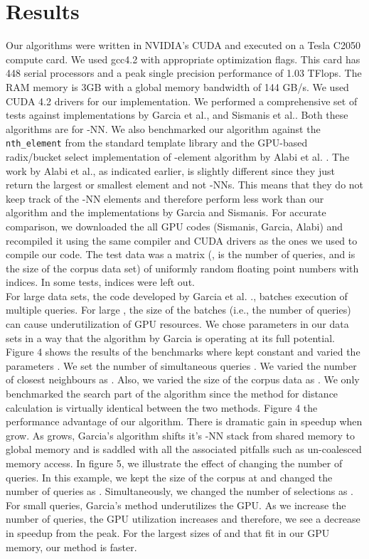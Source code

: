 \documentclass[10pt]{article}
\begin{document}
\section*{Results}
Our algorithms were written in NVIDIA's CUDA \cite{Sanders:2010} and executed on a Tesla C2050 compute card. We used gcc4.2 with appropriate optimization flags. This card has 448 serial processors and a peak single precision performance of 1.03 TFlops.  The RAM memory is 3GB with a global memory bandwidth of 144 GB/s. We used CUDA 4.2 drivers for our implementation. We performed a comprehensive set of tests against implementations by Garcia et al.\cite{Garcia2010}, and Sismanis et al.\cite{Sismanis:2012}. Both these algorithms are for -NN. We also benchmarked our algorithm against the  \texttt{nth\_element} from the standard template library and the GPU-based radix/bucket select implementation of -element algorithm by Alabi et al.  \cite{Alabi:2012}. The work by Alabi et al., as indicated earlier, is slightly different since they just return the  largest or smallest element and not -NNs. This means that they do not keep track of the -NN elements and therefore perform less work than our algorithm and the implementations by Garcia and Sismanis.  For accurate comparison, we downloaded the all GPU codes (Sismanis, Garcia, Alabi) and recompiled it using the same compiler and CUDA drivers as the ones we used to compile our code. The test data was a matrix (,  is the number of queries, and  is the size of the corpus data set) of uniformly random floating point numbers with indices. In some tests, indices were left out.\\

For large data sets, the code developed by Garcia et al. \cite{Garcia2010}., batches execution of multiple queries. For large , the size of the batches (i.e., the number of queries) can cause underutilization of GPU resources. We chose parameters in our data sets  in a way that the algorithm by Garcia is operating at its full potential. Figure 4 shows the results of the benchmarks where kept  constant and varied the parameters . We set the number of simultaneous queries . We varied the number of closest neighbours as . Also, we varied the size of the corpus data as . We only benchmarked the search part of the algorithm since the method for distance calculation is virtually identical between the two methods.  Figure 4 the performance advantage of our algorithm. There is dramatic gain in speedup when  grow. As   grows, Garcia's algorithm shifts it's -NN stack from shared memory to global memory and is saddled with all the associated pitfalls such as un-coalesced memory access.  In figure 5,  we illustrate the effect of changing the number of queries. In this example, we kept the size of the corpus at  and changed the number of queries as . Simultaneously, we changed the number of selections as . For small queries, Garcia's method underutilizes the GPU.  As we increase the number of queries, the GPU utilization increases and therefore, we see a decrease in speedup from the peak. For the largest sizes of  and  that fit in our GPU memory, our method is  faster. \\
\end{document}
